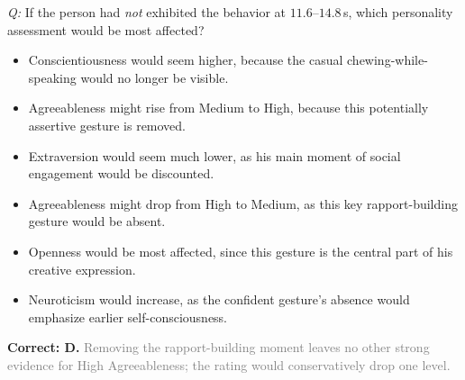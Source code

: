 \documentclass{article}
\begin{document}
\begin{examplebox}[title={(2) Counterfactual Reasoning}]
\emph{Q:} If the person had \emph{not} exhibited the behavior at $11.6$--$14.8$\,s, which personality assessment would be most affected?
\begin{itemize}[leftmargin=1.4em, itemsep=0pt, topsep=1pt, parsep=0pt]
\item[A.] Conscientiousness would seem higher, because the casual chewing-while-speaking would no longer be visible.
\item[B.] Agreeableness might rise from Medium to High, because this potentially assertive gesture is removed.
\item[C.] Extraversion would seem much lower, as his main moment of social engagement would be discounted.
\item[D.] Agreeableness might drop from High to Medium, as this key rapport-building gesture would be absent.
\item[E.] Openness would be most affected, since this gesture is the central part of his creative expression.
\item[F.] Neuroticism would increase, as the confident gesture's absence would emphasize earlier self-consciousness.
\end{itemize}
\textcolor{humanc}{\textbf{Correct: D.}} \textcolor{gray}{ Removing the rapport-building moment leaves no other strong evidence for High Agreeableness; the rating would conservatively drop one level.}

\end{examplebox}
\end{document}

